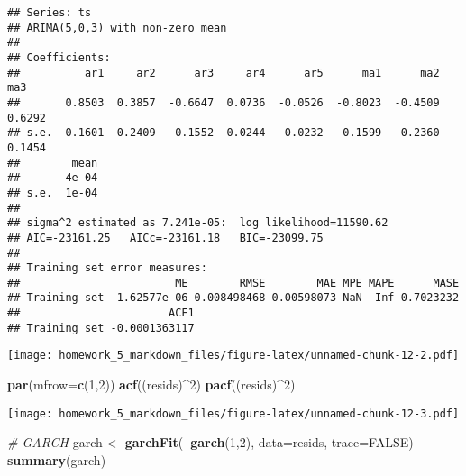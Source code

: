 \documentclass[]{article}
\newenvironment{Shaded}{\begin{snugshade}}{\end{snugshade}}
\newcommand{\KeywordTok}[1]{\textcolor[rgb]{0.13,0.29,0.53}{\textbf{#1}}}
\newcommand{\DataTypeTok}[1]{\textcolor[rgb]{0.13,0.29,0.53}{#1}}
\newcommand{\DecValTok}[1]{\textcolor[rgb]{0.00,0.00,0.81}{#1}}
\newcommand{\StringTok}[1]{\textcolor[rgb]{0.31,0.60,0.02}{#1}}
\newcommand{\CommentTok}[1]{\textcolor[rgb]{0.56,0.35,0.01}{\textit{#1}}}
\newcommand{\OtherTok}[1]{\textcolor[rgb]{0.56,0.35,0.01}{#1}}
\newcommand{\OperatorTok}[1]{\textcolor[rgb]{0.81,0.36,0.00}{\textbf{#1}}}
\newcommand{\NormalTok}[1]{#1}
\begin{document}
\begin{verbatim}
## Series: ts 
## ARIMA(5,0,3) with non-zero mean 
## 
## Coefficients:
##          ar1     ar2      ar3     ar4      ar5      ma1      ma2     ma3
##       0.8503  0.3857  -0.6647  0.0736  -0.0526  -0.8023  -0.4509  0.6292
## s.e.  0.1601  0.2409   0.1552  0.0244   0.0232   0.1599   0.2360  0.1454
##        mean
##       4e-04
## s.e.  1e-04
## 
## sigma^2 estimated as 7.241e-05:  log likelihood=11590.62
## AIC=-23161.25   AICc=-23161.18   BIC=-23099.75
## 
## Training set error measures:
##                        ME        RMSE        MAE MPE MAPE      MASE
## Training set -1.62577e-06 0.008498468 0.00598073 NaN  Inf 0.7023232
##                       ACF1
## Training set -0.0001363117
\end{verbatim}

\begin{Shaded}
\end{Shaded}

\texttt{[image: homework\_5\_markdown\_files/figure-latex/unnamed-chunk-12-2.pdf]}

\begin{Shaded}
\begin{Highlighting}[]
\KeywordTok{par}\NormalTok{(}\DataTypeTok{mfrow=}\KeywordTok{c}\NormalTok{(}\DecValTok{1}\NormalTok{,}\DecValTok{2}\NormalTok{))}
\KeywordTok{acf}\NormalTok{((resids)}\OperatorTok{^}\DecValTok{2}\NormalTok{)}
\KeywordTok{pacf}\NormalTok{((resids)}\OperatorTok{^}\DecValTok{2}\NormalTok{)}
\end{Highlighting}
\end{Shaded}

\texttt{[image: homework\_5\_markdown\_files/figure-latex/unnamed-chunk-12-3.pdf]}

\begin{Shaded}
\begin{Highlighting}[]
\CommentTok{# GARCH}
\NormalTok{garch <-}\StringTok{ }\KeywordTok{garchFit}\NormalTok{(}\OperatorTok{~}\KeywordTok{garch}\NormalTok{(}\DecValTok{1}\NormalTok{,}\DecValTok{2}\NormalTok{), }\DataTypeTok{data=}\NormalTok{resids, }\DataTypeTok{trace=}\OtherTok{FALSE}\NormalTok{)}
\KeywordTok{summary}\NormalTok{(garch)}
\end{Highlighting}
\end{Shaded}
\end{document}
